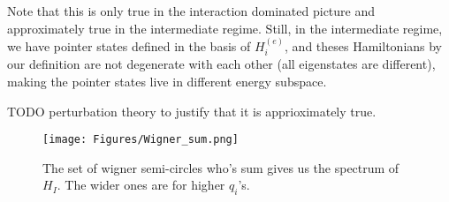\documentclass{article}
\begin{document}
Note that this is only true in the interaction dominated picture and approximately true in the intermediate regime. 
Still, in the intermediate regime, we have pointer states defined in the basis of $H^{(e)}_i$, and theses Hamiltonians by our definition are not degenerate with each other (all eigenstates are different), making the pointer states live in different energy subspace. 

TODO perturbation theory to justify that it is apprioximately true.


\begin{figure}[h]
    \centering
    \texttt{[image: Figures/Wigner\_sum.png]}
    \caption{The set of wigner semi-circles who's sum gives us the spectrum of $H_I$. The wider ones are for higher $q_i$'s.}
    \label{fig:wigner_sum}
\end{figure}

\begin{comment}
    

Then,
\begin{equation}
    H|\psi(0)\rangle=|q_1\rangle(\frac{2+q_1}{\sqrt{w}})\sum_jc_j|e_j\rangle+|q_2\rangle(\frac{2+q_2}{\sqrt{1-w}})\sum_jc_j'|e_j\rangle
\end{equation}
or more generally,
\begin{equation}
    |\psi(t)\rangle=|q_1\rangle(\frac{2+q_1}{\sqrt{w}})\sum_jc_j|e_j\rangle+|q_2\rangle(\frac{2+q_2}{\sqrt{1-w}})\sum_jc_j'|e_j\rangle
\end{equation}

which is no longer separable, and by its factorizability by $|q_1\rangle$ and $|q_2\rangle$, we understand that for all $t$,
\begin{equation}
    |\psi(t)\rangle=\frac{1}{\sqrt{N}}(s_1|q_1\rangle|E_1(t)\rangle+s_2|q_2\rangle|E_2(t)\rangle)
\end{equation}
This means that the Schmidt decomposition of our system+env always has 2 nonzeros schmidt weights at most. But this decomposition (ie in terms of 2 states $|q_i\rangle |E_j\rangle$) is not immediately the 2 schmidt states. Indeed, Schmidt 1 starts up as $|\psi\rangle$ and evolves to something with most of its weight in a factor in from of $|q_1\rangle|E_1\rangle$. But of note, our pure state starts with nonzero value in 200+200 total eigenstates, the Schmidt states share theses with each other, 200 each. (Need to do a part where we look closer at evolution, see black board image.)

Note, $|E_i\rangle=\sum_jc_{ji}(t)|e_j\rangle$.
\end{comment}
\end{document}
